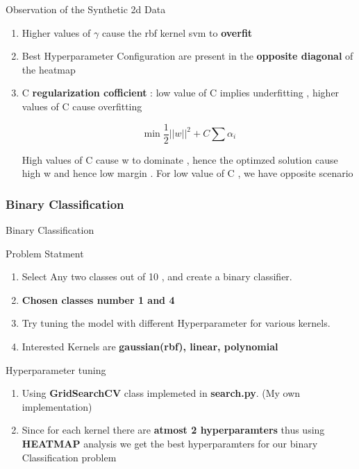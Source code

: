 \documentclass[12pt,t]{beamer}
\begin{document}
\begin{frame}[t]
\scriptsize
\large Observation of the Synthetic 2d Data

\begin{enumerate}
    \scriptsize
    \item Higher values of \textbf{$\gamma$} cause the rbf kernel svm to \textbf{overfit}
    \item Best Hyperparameter Configuration are present in the \textbf{opposite diagonal}
            of the heatmap 
    \item C \textbf{regularization cofficient} : low value of C implies underfitting ,
            higher values of C cause overfitting
            
            $$ \min \frac{1}{2} ||w||^{2} + C \sum{\alpha_{i}}$$

            \centering High values of C cause w to dominate , hence the optimzed
            solution cause high w and hence low margin . For low value of C , we have
            opposite scenario
\end{enumerate}
\end{frame}


\subsubsection{Binary Classification}

\begin{frame}[t]{Binary Classification}
    \scriptsize
    \begin{block}{Problem Statment}
        \begin{enumerate}
            \item Select Any two classes out of 10 , and create a binary classifier.
            \item \textbf{Chosen classes number 1 and 4}
            \item Try tuning the model with different Hyperparameter for various kernels.
            \item Interested Kernels are \textbf{gaussian(rbf), linear, polynomial}
        \end{enumerate}

        
    \end{block}
    \begin{block}{Hyperparameter tuning}
        \begin{enumerate}
            \item Using \textbf{GridSearchCV} class implemeted in \textbf{search.py}. (My own implementation)
            \item Since for each kernel there are \textbf{atmost 2 hyperparamters} thus using \textbf{HEATMAP} analysis 
                we get the best hyperparamters for our binary Classification problem
        \end{enumerate}
    \end{block}
\end{frame}
\end{document}
